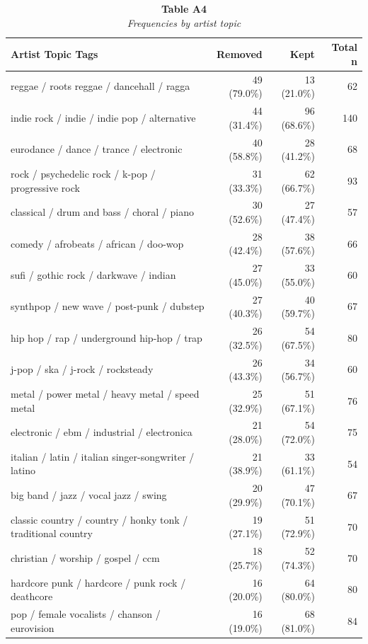 \begin{table}[t]
\caption*{
{\large \textbf{Table A4}} \\ 
{\small \emph{Frequencies by artist topic}}
} 
\fontsize{9.0pt}{10.8pt}\selectfont
\begin{tabular*}{\linewidth}{@{\extracolsep{\fill}}lrrr}
\toprule
{Artist Topic Tags} & Removed & Kept & Total n \\ 
\midrule\addlinespace[2.5pt]
reggae / roots reggae / dancehall / ragga & 49 (79.0\%) & 13 (21.0\%) & 62 \\ 
indie rock / indie / indie pop / alternative & 44 (31.4\%) & 96 (68.6\%) & 140 \\ 
eurodance / dance / trance / electronic & 40 (58.8\%) & 28 (41.2\%) & 68 \\ 
rock / psychedelic rock / k-pop / progressive rock & 31 (33.3\%) & 62 (66.7\%) & 93 \\ 
classical / drum and bass / choral / piano & 30 (52.6\%) & 27 (47.4\%) & 57 \\ 
comedy / afrobeats / african / doo-wop & 28 (42.4\%) & 38 (57.6\%) & 66 \\ 
sufi / gothic rock / darkwave / indian & 27 (45.0\%) & 33 (55.0\%) & 60 \\ 
synthpop / new wave / post-punk / dubstep & 27 (40.3\%) & 40 (59.7\%) & 67 \\ 
hip hop / rap / underground hip-hop / trap & 26 (32.5\%) & 54 (67.5\%) & 80 \\ 
j-pop / ska / j-rock / rocksteady & 26 (43.3\%) & 34 (56.7\%) & 60 \\ 
metal / power metal / heavy metal / speed metal & 25 (32.9\%) & 51 (67.1\%) & 76 \\ 
electronic / ebm / industrial / electronica & 21 (28.0\%) & 54 (72.0\%) & 75 \\ 
italian / latin / italian singer-songwriter / latino & 21 (38.9\%) & 33 (61.1\%) & 54 \\ 
big band / jazz / vocal jazz / swing & 20 (29.9\%) & 47 (70.1\%) & 67 \\ 
classic country / country / honky tonk / traditional country & 19 (27.1\%) & 51 (72.9\%) & 70 \\ 
christian / worship / gospel / ccm & 18 (25.7\%) & 52 (74.3\%) & 70 \\ 
hardcore punk / hardcore / punk rock / deathcore & 16 (20.0\%) & 64 (80.0\%) & 80 \\ 
pop / female vocalists / chanson / eurovision & 16 (19.0\%) & 68 (81.0\%) & 84 \\ 

\end{tabular*}
\end{table}
